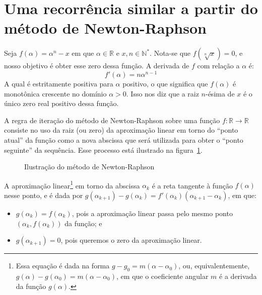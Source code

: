 \documentclass{article}
\author{Danilo J. S. Bellini}
\begin{document}
\maketitle





\section*{Uma recorrência similar a partir do método de Newton-Raphson}

Seja $f(\alpha) = \alpha^n - x$
em que $\alpha \in \mathds{R}$ e $x, n \in \mathds{N}^*$.
Nota-se que $f(\sqrt[n]{x}) = 0$,
e nosso objetivo é obter esse zero dessa função.
A derivada de $f$ com relação a $\alpha$ é:
\[f'(\alpha) = n \alpha^{n-1}\]
A qual é estritamente positiva para $\alpha$ positivo,
o que significa que $f(\alpha)$ é monotônica crescente
no domínio $\alpha > 0$.
Isso nos diz que a raiz $n$-ésima de $x$
é o único zero real positivo dessa função.

A regra de iteração do método de Newton-Raphson
sobre uma função $f:\mathds{R}\to\mathds{R}$
consiste no uso da raiz (ou zero)
da aproximação linear em torno do ``ponto atual'' da função
como a nova abscissa que será utilizada
para obter o ``ponto seguinte'' da sequência.
Esse processo está ilustrado na figura~\ref{fig:newton-raphson}.

\begin{figure}[H]
  \centering
  
  \caption{Ilustração do método de Newton-Raphson}
  \label{fig:newton-raphson}
\end{figure}

A aproximação linear\footnote{
  Essa equação é dada na forma $g - g_0 = m (\alpha - \alpha_0)$,
  ou, equivalentemente,
  $g(\alpha) - g(\alpha_0) = m (\alpha - \alpha_0)$,
  em que o coeficiente angular $m$ é a derivada da função $g(\alpha)$.
} em torno da abscissa $\alpha_k$
é a reta tangente à função $f(\alpha)$ nesse ponto,
e é dada por
$g(\alpha_{k+1}) - g(\alpha_k) =
 f'(\alpha_k) \left( \alpha_{k+1} - \alpha_k \right)$,
em que:
\begin{itemize}
  \item
  $g(\alpha_k) = f(\alpha_k)$, pois a aproximação linear
  passa pelo mesmo ponto $(\alpha_k, f(\alpha_k))$ da função; e
  \item
  $g(\alpha_{k+1}) = 0$,
  pois queremos o zero da aproximação linear.
\end{itemize}
\end{document}
